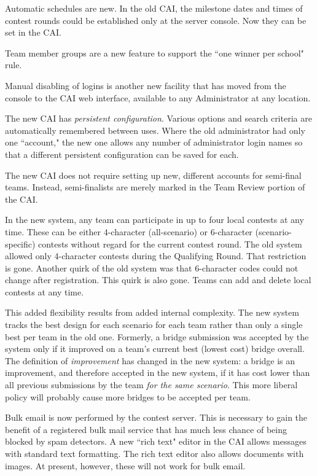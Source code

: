 \documentclass[11pt,letterpaper]{refart}
\begin{document}
Automatic schedules are new. In the old CAI, the milestone dates and
times of contest rounds could be established only at the server
console. Now they can be set in the CAI.

Team member groups are a new feature to support the ``one winner per
school" rule.

Manual disabling of logins is another new facility that has moved from
the console to the CAI web interface, available to any Administrator
at any location.

The new CAI has \emph{persistent configuration}. Various options and
search criteria are automatically remembered between uses. Where the
old administrator had only one ``account," the new one allows any
number of administrator login names so that a different persistent
configuration can be saved for each.

The new CAI does not require setting up new, different accounts for
semi-final teams. Instead, semi-finalists are merely marked in the
Team Review portion of the CAI.

In the new system, any team can participate in up to four local
contests at any time. These can be either 4-character (all-scenario)
or 6-character (scenario-specific) contests without regard for the
current contest round. The old system allowed only 4-character
contests during the Qualifying Round. That restriction is
gone. Another quirk of the old system was that 6-character codes could
not change after registration. This quirk is also gone. Teams can add
and delete local contests at any time.

This added flexibility results from added internal complexity. The new
system tracks the best design for each scenario for each team rather
than only a single best per team in the old one. Formerly, a bridge
submission was accepted by the system only if it improved on a team's
current best (lowest cost) bridge overall. The definition of
\emph{improvement} has changed in the new system: a bridge is an
improvement, and therefore accepted in the new system, if it has cost
lower than all previous submissions by the team \emph{for the same
  scenario}. This more liberal policy will probably cause more bridges
to be accepted per team.

Bulk email is now performed by the contest server. This is necessary
to gain the benefit of a registered bulk mail service that has much
less chance of being blocked by spam detectors. A new ``rich text"
editor in the CAI allows messages with standard text formatting. The
rich text editor also allows documents with images. At present,
however, these will not work for bulk email.
\end{document}
